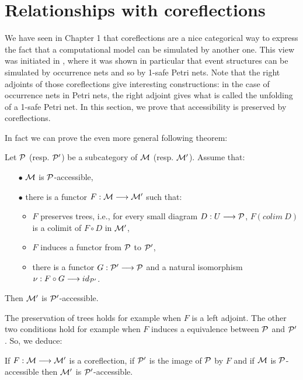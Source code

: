 






\section{Relationships with coreflections}
\label{relcoreflection}

We have seen in Chapter 1 that coreflections are a nice categorical way to express the fact that a computational model can be simulated by another one. This view was initiated in \cite{winskel84}, where it was shown in particular 
that event structures can be simulated by occurrence nets and so by 1-safe Petri nets. Note that the right adjoints of those coreflections give interesting constructions: in the case of occurrence nets in Petri nets, the right adjoint gives what is called the unfolding of a 1-safe Petri net. In this section, we prove that accessibility is preserved by coreflections.

In fact we can prove the even more general following theorem:

\begin{theo}
\label{the:core}
Let $\mathcal{P}$ (resp. $\mathcal{P}'$) be a subcategory of $\mathcal{M}$ (resp. $\mathcal{M}'$). Assume that:
\begin{itemize}
	\item[$\bullet$] $\mathcal{M}$ is $\mathcal{P}$-accessible,
	\item[$\bullet$] there is a functor $F : \mathcal{M} \longrightarrow \mathcal{M}'$ such that:
	\begin{itemize}
		\item $F$ preserves trees, i.e., for every small diagram $D : U \longrightarrow \mathcal{P}$, $F(colim \ D)$ is a colimit of $F\circ D$ in $\mathcal{M}'$,
		\item $F$ induces a functor from $\mathcal{P}$ to $\mathcal{P}'$,
		\item there is a functor $G : \mathcal{P}' \longrightarrow \mathcal{P}$ and a natural isomorphism $\nu : F\circ G \longrightarrow id_{\mathcal{P}'}$.
	\end{itemize}
\end{itemize}
Then $\mathcal{M}'$ is $\mathcal{P}'$-accessible.
\end{theo}


The preservation of trees holds for example when $F$ is a left adjoint. The other two conditions hold for example when $F$ induces a equivalence between $\mathcal{P}$ and $\mathcal{P}'$. So, we deduce:

\begin{coro}
If $F : \mathcal{M} \longrightarrow \mathcal{M}'$ is a coreflection, if $\mathcal{P}'$ is the image of $\mathcal{P}$ by $F$ and if $\mathcal{M}$ is $\mathcal{P}$-accessible then $\mathcal{M}'$ is $\mathcal{P}'$-accessible.
\end{coro}



